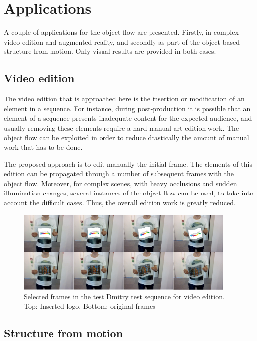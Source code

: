 \chapter{Applications} \label{chap:apps}

A couple of applications for the object flow are presented. Firstly, 
in complex video edition and augmented reality, and secondly as part 
of the object-based structure-from-motion. Only visual results are provided 
in both cases.

\section{Video edition}

The video edition that is approached here is the insertion or modification of 
an element in a sequence. For instance, during post-production it is possible that 
an element of a sequence presents inadequate content for the expected audience, and usually 
removing these elements require a hard manual art-edition work. The object flow 
can be exploited in order to reduce drastically the amount of manual work that has to be done. 

The proposed approach is to edit manually the initial frame. The elements of this edition 
can be propagated  through a number of subsequent frames with the object flow. Moreover, 
for complex scenes, with heavy occlusions and sudden illumination changes, several instances 
of the object flow can be used, to take into account the difficult cases. Thus, the overall edition 
work is greatly reduced.

   \begin{figure}[tpbh]
      \centering
      \includegraphics[width=0.95\textwidth]{../images/videoedition.png}
      \caption{  Selected frames in the test Dmitry test sequence for video edition. Top: Inserted logo. Bottom: original frames}
      \label{pt_seg}
   \end{figure}

\section{Structure from motion}

